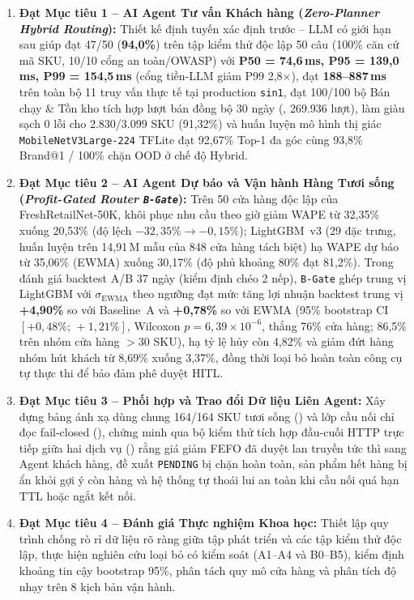 \begin{enumerate}
    \item \textbf{Đạt Mục tiêu 1 -- AI Agent Tư vấn Khách hàng (\emph{Zero-Planner Hybrid Routing}):} Thiết kế định tuyến xác định trước -- LLM có giới hạn sau giúp đạt 47/50 (\textbf{94,0\%}) trên tập kiểm thử độc lập 50 câu (100\% căn cứ mã SKU, 10/10 cổng an toàn/OWASP) với \textbf{P50 = 74,6\,ms, P95 = 139,0\,ms, P99 = 154,5\,ms} (cổng tiền-LLM giảm P99 2,8$\times$), đạt \textbf{188--887\,ms} trên toàn bộ 11 truy vấn thực tế tại production \texttt{sin1}, đạt 100/100 bộ Bán chạy \& Tồn kho tích hợp lượt bán đồng bộ 30 ngày (, 269.936 lượt), làm giàu sạch 0 lỗi cho 2.830/3.099 SKU (91,32\%) và huấn luyện mô hình thị giác \texttt{MobileNetV3Large-224} TFLite đạt 92,67\% Top-1 đa góc cùng 93,8\% Brand@1 / 100\% chặn OOD ở chế độ Hybrid.
    \item \textbf{Đạt Mục tiêu 2 -- AI Agent Dự báo và Vận hành Hàng Tươi sống (\emph{Profit-Gated Router \texttt{B-Gate}}):} Trên 50 cửa hàng độc lập của FreshRetailNet-50K, khôi phục nhu cầu theo giờ giảm WAPE từ 32,35\% xuống 20,53\% (độ lệch $-32{,}35\% \to -0{,}15\%$); LightGBM~v3 (29 đặc trưng, huấn luyện trên 14,91\,M mẫu của 848 cửa hàng tách biệt) hạ WAPE dự báo từ 35,06\% (EWMA) xuống 30,17\% (độ phủ khoảng 80\% đạt 81,2\%). Trong đánh giá backtest A/B 37 ngày (kiểm định chéo 2 nếp), \texttt{B-Gate} ghép trung vị LightGBM với $\sigma_{\text{EWMA}}$ theo ngưỡng  đạt mức tăng lợi nhuận backtest trung vị \textbf{+4,90\%} so với Baseline~A và \textbf{+0,78\%} so với EWMA (95\% bootstrap CI $[+0{,}48\%;\,+1{,}21\%]$, Wilcoxon $p = 6{,}39\times 10^{-6}$, thắng 76\% cửa hàng; 86,5\% trên nhóm cửa hàng $>30$ SKU), hạ tỷ lệ hủy còn 4,82\% và giảm đứt hàng nhóm hút khách từ 8,69\% xuống 3,37\%, đồng thời loại bỏ hoàn toàn công cụ tự thực thi để bảo đảm phê duyệt HITL.
    \item \textbf{Đạt Mục tiêu 3 -- Phối hợp và Trao đổi Dữ liệu Liên Agent:} Xây dựng bảng ánh xạ dùng chung 164/164 SKU tươi sống () và lớp cầu nối chỉ đọc fail-closed (), chứng minh qua bộ kiểm thử tích hợp đầu-cuối HTTP trực tiếp giữa hai dịch vụ () rằng giá giảm FEFO đã duyệt lan truyền tức thì sang Agent khách hàng, đề xuất \texttt{PENDING} bị chặn hoàn toàn, sản phẩm hết hàng bị ẩn khỏi gợi ý còn hàng và hệ thống tự thoái lui an toàn khi cầu nối quá hạn TTL hoặc ngắt kết nối.
    \item \textbf{Đạt Mục tiêu 4 -- Đánh giá Thực nghiệm Khoa học:} Thiết lập quy trình chống rò rỉ dữ liệu rõ ràng giữa tập phát triển và các tập kiểm thử độc lập, thực hiện nghiên cứu loại bỏ có kiểm soát (A1--A4 và B0--B5), kiểm định khoảng tin cậy bootstrap 95\%, phân tách quy mô cửa hàng và phân tích độ nhạy trên 8 kịch bản vận hành.
\end{enumerate}

